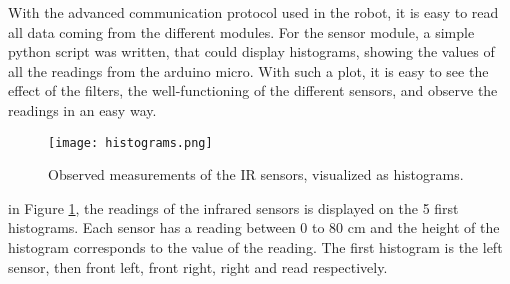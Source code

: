 With the advanced communication protocol used in the robot, it is easy to read all data coming from the different modules. For the sensor module, a simple python script was written, that could display histograms, showing the values of all the readings from the arduino micro. With such a plot, it is easy to see the effect of the filters, the well-functioning of the different sensors, and observe the readings in an easy way.

\begin{figure}[H]
  \centering
  \texttt{[image: histograms.png]}
  \caption{Observed measurements of the IR sensors, visualized as histograms.}
\label{fig:histograms}
\end{figure}

in Figure \ref{fig:histograms}, the readings of the infrared sensors is displayed on the 5 first histograms. Each sensor has a reading between 0 to 80 cm and the height of the histogram corresponds to the value of the reading. The first histogram is the left sensor, then front left, front right, right and read respectively.